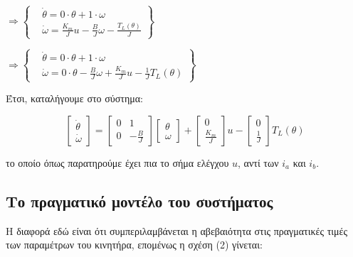 \documentclass{article}
\begin{document}
    \hfill\break
    \begin{math}
        \Rightarrow \left\{
        \begin{aligned}
            & \dot{\theta} = 0 \cdot \theta + 1 \cdot \omega \\
            & \dot{\omega} = \frac{K_m}{J} u - \frac{B}{J} \omega - \frac{T_L(\theta)}{J}
        \end{aligned}\right\}
    \end{math}
    
    \hfill\break
    \begin{math}
        \Rightarrow \left\{
        \begin{aligned}
            & \dot{\theta} = 0 \cdot \theta + 1 \cdot \omega \\
            & \dot{\omega} = 0 \cdot \theta - \frac{B}{J} \omega + \frac{K_m}{J} u - \frac{1}{J} T_L(\theta)
        \end{aligned}\right\}
    \end{math}
    
    \hfill\break
    \hfill\break
    Έτσι, καταλήγουμε στο σύστημα:
    
    \begin{equation}
        \begin{bmatrix}
            \dot{\theta} \\
            \dot{\omega}
        \end{bmatrix} =
        \begin{bmatrix}
            0 &   1 \\
            0 & -\frac{B}{J}
        \end{bmatrix}
        \begin{bmatrix}
            \theta \\
            \omega
        \end{bmatrix} +
        \begin{bmatrix}
             0 \\ 
            \frac{K_m}{J}
        \end{bmatrix} u -
        \begin{bmatrix}
             0 \\ 
            \frac{1}{J}
        \end{bmatrix} T_L(\theta)
    \end{equation}
    
    \hfill\break
    το οποίο όπως παρατηρούμε έχει πια το σήμα ελέγχου \(u\), αντί των \(i_a\) και \(i_b\).
    
    \subsection{Το πραγματικό μοντέλο του συστήματος}
    Η διαφορά εδώ είναι ότι συμπεριλαμβάνεται η αβεβαιότητα στις πραγματικές τιμές των παραμέτρων του κινητήρα, επομένως η σχέση (2) γίνεται:
    
\end{document}
